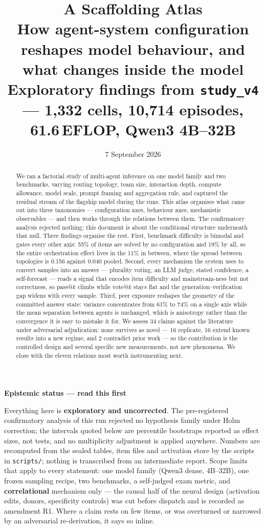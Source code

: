 \documentclass[10pt,a4paper]{article}
\title{\vspace{-1.4cm}\textbf{A Scaffolding Atlas}\\[2pt]
\large How agent-system configuration reshapes model behaviour, and what changes inside the model\\[2pt]
\normalsize\normalfont Exploratory findings from \texttt{study\_v4} --- 1{,}332 cells, 10{,}714 episodes, 61.6\,EFLOP, Qwen3 4B--32B}
\author{}
\date{\small 7 September 2026}
\newenvironment{aside}[1]{%
  \par\medskip\noindent
  \begin{lrbox}{\asidebox}%
  \begin{minipage}{\dimexpr\linewidth-2\fboxsep\relax}%
  \small\textbf{\textcolor{accent}{#1}}\par\smallskip\small
}{%
  \end{minipage}%
  \end{lrbox}%
  \noindent\colorbox{panel}{\usebox{\asidebox}}\par\medskip
}
\begin{document}
\maketitle
\vspace{-1.1cm}

\begin{abstract}
\noindent We ran a factorial study of multi-agent inference on one model family and two benchmarks, varying routing topology, team size, interaction depth, compute allowance, model scale, prompt framing and aggregation rule, and captured the residual stream of the flagship model during the runs. This atlas organises what came out into three taxonomies --- configuration axes, behaviour axes, mechanistic observables --- and then works through the relations between them. The confirmatory analysis rejected nothing; this document is about the conditional structure underneath that null. Three findings organise the rest. First, benchmark difficulty is bimodal and gates every other axis: 55\% of items are solved by no configuration and 19\% by all, so the entire orchestration effect lives in the 11\% in between, where the spread between topologies is 0.156 against 0.040 pooled. Second, every mechanism the system uses to convert samples into an answer --- plurality voting, an LLM judge, stated confidence, a self-forecast --- reads a signal that encodes item difficulty and mainstream-ness but not correctness, so pass@$k$ climbs while vote@$k$ stays flat and the generation--verification gap widens with every sample. Third, peer exposure reshapes the geometry of the committed answer state: variance concentrates from 61\% to 74\% on a single axis while the mean separation between agents is unchanged, which is anisotropy rather than the convergence it is easy to mistake it for. We assess 34 claims against the literature under adversarial adjudication: none survives as novel --- 16 replicate, 16 extend known results into a new regime, and 2 contradict prior work --- so the contribution is the controlled design and several specific new measurements, not new phenomena. We close with the eleven relations most worth instrumenting next.
\end{abstract}

\begin{aside}{Epistemic status --- read this first}
Everything here is \textbf{exploratory and uncorrected}. The pre-registered confirmatory analysis of this run rejected no hypothesis family under Holm correction; the intervals quoted below are percentile bootstraps reported as effect sizes, not tests, and no multiplicity adjustment is applied anywhere. Numbers are recomputed from the sealed tables, item files and activation store by the scripts in \texttt{scripts/}; nothing is transcribed from an intermediate report. Scope limits that apply to every statement: one model family (Qwen3 dense, 4B--32B), one frozen sampling recipe, two benchmarks, a self-judged exam metric, and \textbf{correlational} mechanism only --- the causal half of the neural design (activation edits, donors, specificity controls) was cut before dispatch and is recorded as amendment R1. Where a claim rests on few items, or was overturned or narrowed by an adversarial re-derivation, it says so inline.
\end{aside}
\end{document}
